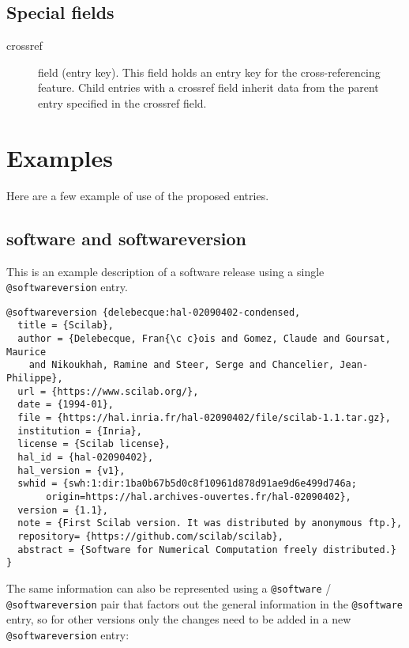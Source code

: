 \subsection{Special fields}
\begin{description}
\item[{crossref}] field (entry key). This field holds an entry key for the
cross-referencing feature. Child entries with a crossref field inherit data
from the parent entry specified in the crossref field.
\end{description}

\section{Examples}

Here are a few example of use of the proposed entries.

\subsection{software and softwareversion}

This is an example description of a software release using a single \texttt{@softwareversion} entry.

\begin{verbatim}
@softwareversion {delebecque:hal-02090402-condensed,
  title = {Scilab},
  author = {Delebecque, Fran{\c c}ois and Gomez, Claude and Goursat, Maurice 
    and Nikoukhah, Ramine and Steer, Serge and Chancelier, Jean-Philippe},
  url = {https://www.scilab.org/},
  date = {1994-01},
  file = {https://hal.inria.fr/hal-02090402/file/scilab-1.1.tar.gz},
  institution = {Inria},
  license = {Scilab license},
  hal_id = {hal-02090402},
  hal_version = {v1},
  swhid = {swh:1:dir:1ba0b67b5d0c8f10961d878d91ae9d6e499d746a;
	   origin=https://hal.archives-ouvertes.fr/hal-02090402},
  version = {1.1},
  note = {First Scilab version. It was distributed by anonymous ftp.},
  repository= {https://github.com/scilab/scilab},
  abstract = {Software for Numerical Computation freely distributed.}
}
\end{verbatim}

The same information can also be represented using a \texttt{@software} / \texttt{@softwareversion}
pair that factors out the general information in the \texttt{@software} entry, so for
other versions only the changes need to be added in a new \texttt{@softwareversion} entry:

